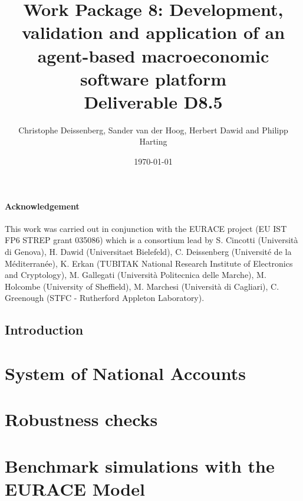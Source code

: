 \documentclass[a4paper,11pt]{book}
\begin{document}
\title{Work Package 8: Development, validation and application of an agent-based macroeconomic software platform \\[.3cm] 
Deliverable D8.5}
\author{Christophe Deissenberg, Sander van der Hoog, Herbert Dawid and Philipp Harting}
\date{\today}
\maketitle
\tableofcontents

\subsubsection*{Acknowledgement}
This work was carried out in conjunction with the EURACE project (EU IST FP6
STREP grant 035086) which is a consortium lead by S. Cincotti (Universit\`{a} di
Genova), H. Dawid (Universitaet Bielefeld), C. Deissenberg (Universit\'{e} de la
M\'{e}diterran\'{e}e), K. Erkan (TUBITAK National Research Institute of Electronics
and Cryptology), M. Gallegati  (Universit\`{a} Politecnica delle Marche), M.
Holcombe (University of Sheffield), M. Marchesi (Universit\`{a} di Cagliari), C.
Greenough (STFC - Rutherford Appleton Laboratory).

\clearpage
\section*{Introduction}


\chapter{System of National Accounts}



\chapter{Robustness checks}


\chapter{Benchmark simulations with the EURACE Model}


%




\end{document}
